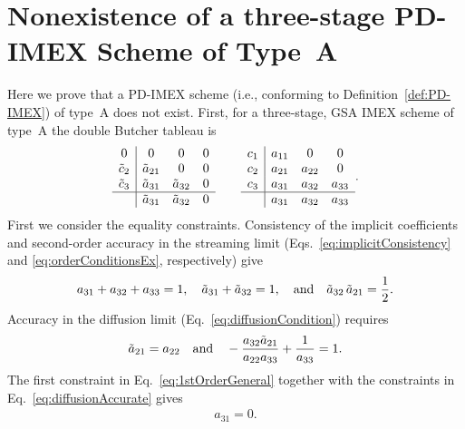 \clearpage

\section{Nonexistence of a three-stage PD-IMEX Scheme of Type~A}
\label{app:noTypeA}

Here we prove that a PD-IMEX scheme (i.e., conforming to Definition~\ref{def:PD-IMEX}) of type~A does not exist.  
First, for a three-stage, GSA IMEX scheme of type~A the double Butcher tableau is
\begin{equation*}
  \begin{array}{c | c c c}
  	      0       & 0              & 0              & 0 \\
  	\tilde{c}_{2} & \tilde{a}_{21} & 0              & 0 \\
  	\tilde{c}_{3} & \tilde{a}_{31} & \tilde{a}_{32} & 0 \\ \hline
  	              & \tilde{a}_{31} & \tilde{a}_{32} & 0
  \end{array}
  \qquad
  \begin{array}{c | c c c}
    c_{1} & a_{11} & 0      & 0      \\
  	c_{2} & a_{21} & a_{22} & 0      \\
  	c_{3} & a_{31} & a_{32} & a_{33} \\ \hline
  	      & a_{31} & a_{32} & a_{33}
  \end{array}.
\end{equation*}
First we consider the equality constraints.  
Consistency of the implicit coefficients and second-order accuracy in the streaming limit (Eqs.~\eqref{eq:implicitConsistency} and \eqref{eq:orderConditionsEx}, respectively) give
\begin{align}
  a_{31} + a_{32} + a_{33} = 1, \quad \tilde{a}_{31} + \tilde{a}_{32} = 1, \quad \text{and}\quad \tilde{a}_{32}\,\tilde{a}_{21} =  \frac{1}{2}.
  \label{eq:1stOrderGeneral}
\end{align}
Accuracy in the diffusion limit (Eq.~\eqref{eq:diffusionCondition}) requires 
\begin{align}
  \tilde{a}_{21} = a_{22}
  \quad\text{and}\quad 
  -\frac{a_{32} \tilde{a}_{21}}{a_{22}a_{33}} + \frac{1}{a_{33}} =1.
\label{eq:diffusionAccurate}
\end{align}
The first constraint in Eq.~\eqref{eq:1stOrderGeneral} together with the constraints in Eq.~\eqref{eq:diffusionAccurate} gives
\begin{align}
  a_{31} = 0.
  \label{eq:a31is0}
\end{align}
